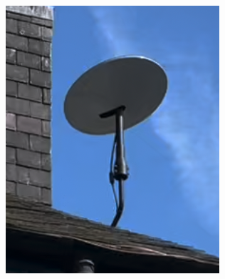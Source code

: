 \begin{figure}
    \centering
    \begin{subfigure}{.18\textwidth}
        \centering\includegraphics[width=\textwidth]{img/unstowed.png}\\\vspace{.35em}

\end{subfigure}
\end{figure}
